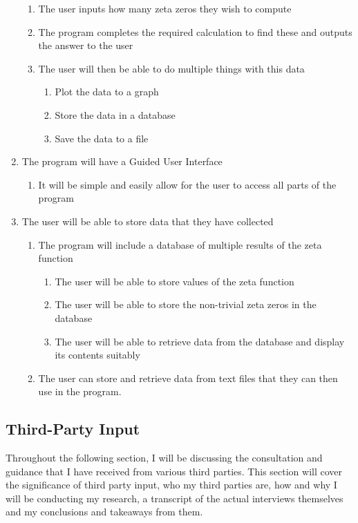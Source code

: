 \documentclass{article}
\begin{document}
\begin{enumerate}
    \begin{enumerate}
        \item The user inputs how many zeta zeros they wish to compute
        \item The program completes the required calculation to find these and outputs the answer to the user
        \item The user will then be able to do multiple things with this data
        \begin{enumerate}
            \item Plot the data to a graph
            \item Store the data in a database
            \item Save the data to a file
        \end{enumerate}
    \end{enumerate}
    \item The program will have a Guided User Interface
    \begin{enumerate}
        \item It will be simple and easily allow for the user to access all parts of the program
    \end{enumerate}
    \item The user will be able to store data that they have collected
    \begin{enumerate}
        \item The program will include a database of multiple results of the zeta function
        \begin{enumerate}
            \item The user will be able to store values of the zeta function
            \item The user will be able to store the non-trivial zeta zeros in the database
            \item The user will be able to retrieve data from the database and display its contents suitably
        \end{enumerate}
        \item The user can store and retrieve data from text files that they can then use in the program.
    \end{enumerate}
\end{enumerate}
\clearpage
\subsection{Third-Party Input}

Throughout the following section, I will be discussing the consultation and guidance that I have received from various third parties. This section will cover the significance of third party input, who my third parties are, how and why I will be conducting my research, a transcript of the actual interviews themselves and my conclusions and takeaways from them.
\end{document}
